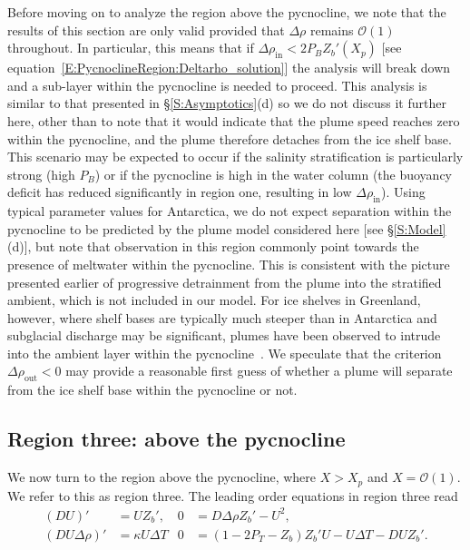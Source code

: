 \documentclass[openacc]{rsproca_new}%
\newcommand{\order}[1]{\mathcal{O}(#1)}
\newcommand{\Pb}{\textit{P}_B}  %
\newcommand{\Pt}{\textit{P}_T}
\renewcommand{\in}{\text{in}} %
\newcommand{\out}{\text{out}}
\begin{document}
Before moving on to analyze the  region above the pycnocline, we note that the results of this section are only valid provided that $\Delta \rho$ remains $\order{1}$ throughout. In particular, this means that if $\Delta \rho_{\in} < 2 \Pb Z_b'(X_p)$ [see equation~\eqref{E:PycnoclineRegion:Deltarho_solution}] the analysis will break down and a sub-layer within the pycnocline is needed to proceed. This analysis is similar to that presented in \S\ref{S:Asymptotics}(d) so we do not discuss it further here, other than to note that it would indicate that the plume speed reaches zero within the pycnocline, and the plume therefore detaches from the ice shelf base. This scenario may be expected to occur if the salinity stratification is particularly strong (high $\Pb$) or if the pycnocline is high in the water column (the buoyancy deficit has reduced significantly in region one, resulting in low $\Delta \rho_{\in}$). Using typical parameter values for Antarctica, we do not expect separation within the pycnocline to be predicted by the plume model considered here [see \S\ref{S:Model}(d)], but note that observation in this region commonly point towards the presence of meltwater within the pycnocline. This is consistent with the picture presented earlier of progressive detrainment from the plume into the stratified ambient, which is not included in our model. For ice shelves in Greenland, however, where shelf bases are typically much steeper than in Antarctica and subglacial discharge may be significant, plumes have been observed to intrude into the ambient layer within the pycnocline~\cite{Straneo2011NatureGeo}. We speculate that the criterion $\Delta \rho_\out < 0$ may provide a reasonable first guess of whether a plume will separate from the ice shelf base within the pycnocline or not.

\subsection{Region three: above the pycnocline}\label{S:Asymptotics:Region3}
We now turn to the region above the pycnocline,  where $X > X_p$ and $X = \order{1}$. We refer to this as region three. The leading order equations in region three read
\begin{align}
 (DU)' &= U Z_b', &
0 &= D \Delta \rho Z_b' - U^2, \label{E:Region3:mass}\\
(DU\Delta \rho)'  &=\kappa U \Delta T &
0&= (1  - 2\Pt -  Z_b)Z_b'U- U\Delta T - DU Z_b'.\label{E:Region3:thermal}
\end{align}
\end{document}
